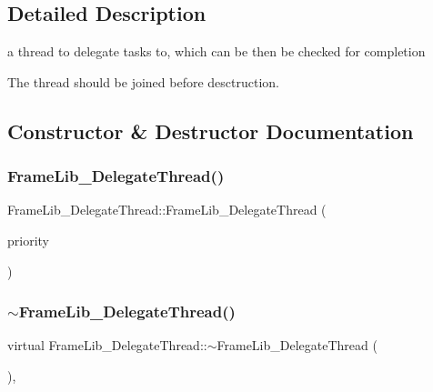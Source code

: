 \subsection{Detailed Description}
a thread to delegate tasks to, which can be then be checked for completion 

The thread should be joined before desctruction. 

\subsection{Constructor \& Destructor Documentation}
\mbox{\label{class_frame_lib___delegate_thread_a0b56650235d213cb94df48dadd5ac657}} 
\subsubsection{\texorpdfstring{Frame\+Lib\+\_\+\+Delegate\+Thread()}{FrameLib\_DelegateThread()}\hspace{0.1cm}{\footnotesize\ttfamily [1/2]}}
{\footnotesize\ttfamily Frame\+Lib\+\_\+\+Delegate\+Thread\+::\+Frame\+Lib\+\_\+\+Delegate\+Thread (\begin{DoxyParamCaption}\item[{\hyperlink{class_frame_lib___thread_a99a5e56edcadf37e3388f5557e8ec7ed}{Frame\+Lib\+\_\+\+Thread\+::\+Priority\+Level}}]{priority }\end{DoxyParamCaption})\hspace{0.3cm}{\ttfamily [inline]}}

\mbox{\label{class_frame_lib___delegate_thread_a85bf48f07bb1a0f666be8c3ca7119c26}} 
\subsubsection{\texorpdfstring{$\sim$\+Frame\+Lib\+\_\+\+Delegate\+Thread()}{~FrameLib\_DelegateThread()}}
{\footnotesize\ttfamily virtual Frame\+Lib\+\_\+\+Delegate\+Thread\+::$\sim$\+Frame\+Lib\+\_\+\+Delegate\+Thread (\begin{DoxyParamCaption}{ }\end{DoxyParamCaption})\hspace{0.3cm}{\ttfamily [inline]}, {\ttfamily [virtual]}}

